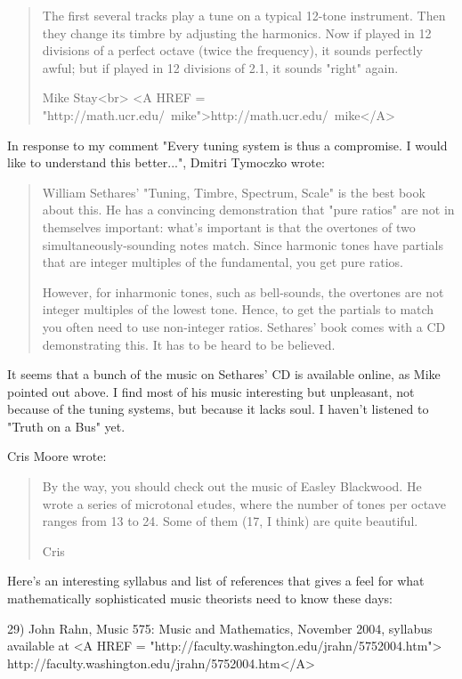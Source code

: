 \begin{quote}
The first several tracks play a tune on a typical 12-tone instrument.
Then they change its timbre by adjusting the harmonics.  Now if played
in 12 divisions of a perfect octave (twice the frequency), it sounds
perfectly awful; but if played in 12 divisions of 2.1, it sounds
"right" again.

Mike Stay<br>
<A HREF = "http://math.ucr.edu/~mike">http://math.ucr.edu/~mike</A>
\end{quote}

In response to my comment "Every tuning system is thus a
compromise.  I would like to understand this better...",
Dmitri Tymoczko wrote:

\begin{quote}
William Sethares' "Tuning, Timbre, Spectrum, Scale" is the best book
about this.  He has a convincing demonstration that "pure ratios" are
not in themselves important: what's important is that the overtones
of two simultaneously-sounding notes match.  Since harmonic tones
have partials that are integer multiples of the fundamental, you get
pure ratios.

However, for inharmonic tones, such as bell-sounds, the overtones are
not integer multiples of the lowest tone.  Hence, to get the partials
to match you often need to use non-integer ratios.  Sethares' book
comes with a CD demonstrating this.  It has to be heard to be
believed.
\end{quote}

It seems that a bunch of the music on Sethares' CD is available online,
as Mike pointed out above.  I find most of his music interesting
but unpleasant, not because of the tuning systems, but because
it lacks soul.  I haven't listened to "Truth on a Bus" yet.

Cris Moore wrote:

\begin{quote}
By the way, you should check out the music of Easley Blackwood.  He 
wrote a series of microtonal etudes, where the number of tones per 
octave ranges from 13 to 24.  Some of them (17, I think) are quite 
beautiful.

Cris
\end{quote}

Here's an interesting syllabus and list of references that gives
a feel for what mathematically sophisticated music theorists need
to know these days:

29) John Rahn, Music 575: Music and Mathematics, November 2004,
syllabus available at
<A HREF = "http://faculty.washington.edu/jrahn/5752004.htm">
http://faculty.washington.edu/jrahn/5752004.htm</A>

